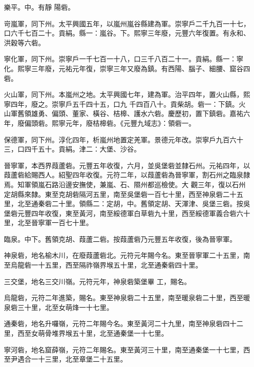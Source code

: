 \begin{pinyinscope}
 樂平。中。有靜
 陽砦。



 岢嵐軍，同下州。太平興國五年，以嵐州嵐谷縣建為軍。崇寧戶二千九百一十七，口六千七百二十。貢絹。縣一：嵐谷。下。熙寧三年廢，元豐六年復置。有永和、洪穀等六砦。



 寧化軍，同下州。崇寧戶一千七百一十八，口三千八百二十一。貢絹。縣一：寧化。熙寧三年廢，元祐元年復，崇寧三年又廢為鎮。有西陽、腦子、細腰、窟谷四砦。



 火山軍，同下州。本嵐州之地。太平興國七年，建為軍。治平四年，置火山縣，熙寧四年，廢之。崇寧戶五千四十五，口九
 千四百八十。貢柴胡。砦一：下鎮。火山軍舊領雄勇、偏頭、董家、橫谷、桔槔、護水六砦。慶歷初，置下鎮砦。嘉祐六年，廢偏頭砦。熙寧元年，廢桔槔砦。《元豐九域志》：領砦一。



 保德軍，同下州。淳化四年，析嵐州地置定羌軍。景德元年改。崇寧戶九百六十三，口四千五十。貢絹。津二：大堡、沙谷。



 晉寧軍，本西界葭蘆砦。元豐五年收復，六月，並吳堡砦並隸石州。元祐四年，以葭蘆砦給賜西人。紹聖四年收復。元符二年，以葭蘆砦為晉寧軍，割石州之臨泉隸焉。知軍領嵐石路沿邊安撫使，兼嵐、石、隰州都巡檢使。大
 觀三年，復以石州定胡縣來隸。東至克胡砦隔河五里，南至吳堡砦一百七十里，西至神泉砦二十五里，北至通秦砦二十里。領縣二：定胡，中。舊領定胡、天渾津、吳堡三砦。按吳堡砦元豐四年收復，東至黃河，南至綏德軍白草砦九十里，西至綏德軍義合砦六十里，北至晉寧軍一百七十里。



 臨泉。中下。舊領克胡、葭蘆二砦。按葭蘆砦乃元豐五年收復，後為晉寧軍。



 神泉砦，地名榆木川，在廢葭蘆砦北。元符元年賜今名。東至晉寧軍二十五里，南至烏龍砦一十五里，西至隔祚嶺界堠五十里，北至通秦砦四十里。



 三交堡，地名三交川嶺。元符元年，神泉砦築堡畢
 工，賜名。



 烏龍砦，元符二年進築，賜名。東至神泉砦二十五里，南至暖泉砦二十里，西至暖泉砦三十里，北至女萌烽一十七里。



 通秦砦，地名升囉嶺，元符二年賜今名。東至黃河二十九里，南至神泉砦四十二里，西至女萌骨堆界堠五十里，北至通秦堡一十七里。



 寧河砦，地名窟薛嶺，元符二年賜名。東至黃河三十里，南至通秦堡一十七里，西至尹遇合一十三里，北至章堡二十五里。




\end{pinyinscope}
